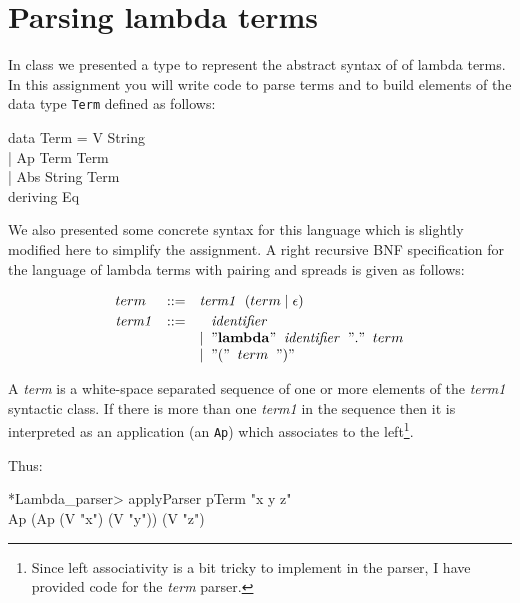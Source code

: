 \documentclass[11pt]{article}
\newcommand{\quot}[1]{"{\tt{{#1}}}"}
\begin{document}

\section{Parsing lambda terms}

In class we presented a type to represent the abstract syntax of of lambda
terms.  In this assignment you will write code to parse terms and to build
elements of the data type {\tt{Term}} defined as follows:

\begin{program*}
\>  data Term = V String \\
\>            | Ap Term Term  \\
\>            | Abs String Term  \\
\>   deriving Eq \\
\end{program*}


\noindent{} We also presented some concrete syntax for this language which is
slightly modified here to simplify the assignment.  A right recursive BNF
specification for the language of lambda terms with pairing and spreads is
given as follows:

\[\begin{array}{lcl}
term & ::=  & {\mathit{term1}} \;\;(term \;| \;\epsilon) \vspace{.25em} \\
{\mathit{term1}} & ::= &  \;\;\; {\mathit{identifier}} \\
&& | \;\;  \quot{{\mathbf{lambda}}} \;\; {\mathit{identifier}} \;\; \quot{.} \;\; term \\
&& | \;\;  \quot{(} \;\; term \;\; \quot{)} \\
\end{array}
\]

\noindent{}A {\it{term}} is a white-space separated sequence of one or more
elements of the {\it{term1}} syntactic class.  If there is more than one
{\it{term1}} in the sequence then it is interpreted as an application (an
{\tt{Ap}}) which associates to the left\footnote{Since left associativity is a
bit tricky to implement in the parser, I have provided code for the {\it{term}}
parser.}.

\noindent{}Thus:
\begin{program*}
\> *Lambda\_parser> applyParser pTerm "x y z" \\
\> Ap (Ap (V "x") (V "y")) (V "z") \\
\end{program*}
\end{document}
